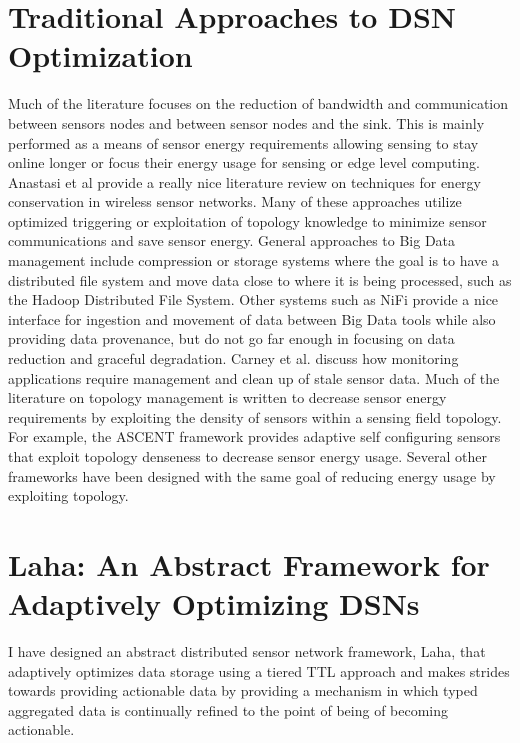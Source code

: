 \section{Traditional Approaches to DSN Optimization}\label{sec:traditional-approaches-to-dsn-optimization}
Much of the literature focuses on the reduction of bandwidth and communication between sensors nodes and between sensor nodes and the sink. This is mainly performed as a means of sensor energy requirements allowing sensing to stay online longer or focus their energy usage for sensing or edge level computing. Anastasi et al\cite{anastasi_energy_2009} provide a really nice literature review on techniques for energy conservation in wireless sensor networks. Many of these approaches utilize optimized triggering\cite{alippi_adaptive_2010} or exploitation of topology knowledge\cite{warrier2007much} to minimize sensor communications and save sensor energy.  General approaches to Big Data management include compression\cite{tang2004compression} or storage systems where the goal is to have a distributed file system and move data close to where it is being processed, such as the Hadoop Distributed File System\cite{warrier2007much}. Other systems such as NiFi\cite{hughes2016survey} provide a nice interface for ingestion and movement of data between Big Data tools while also providing data provenance, but do not go far enough in focusing on data reduction and graceful degradation. Carney et al.\cite{carney2002monitoring} discuss how monitoring applications require management and clean up of stale sensor data. Much of the literature on topology management is written to decrease sensor energy requirements by exploiting the density of sensors within a sensing field topology. For example, the ASCENT\cite{cerpa2004ascent} framework provides adaptive self configuring sensors that exploit topology denseness to decrease sensor energy usage. Several other frameworks have been designed with the same goal of reducing energy usage by exploiting topology\cite{schurgers2002stem,schurgers2002topology}.

\section{Laha: An Abstract Framework for Adaptively Optimizing DSNs}\label{sec:laha:-an-abstract-framework-for-adaptively-optimizing-dsns}
I have designed an abstract distributed sensor network framework, Laha, that adaptively optimizes data storage using a tiered TTL approach and makes strides towards providing actionable data by providing a mechanism in which typed aggregated data is continually refined to the point of being of becoming actionable. %

